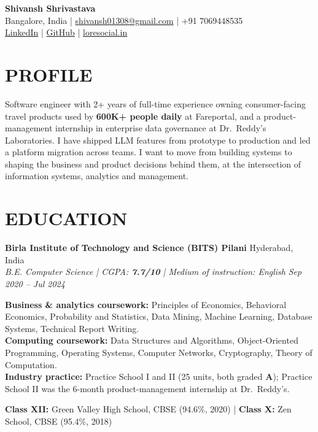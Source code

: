 \documentclass[a4paper,10pt]{extarticle}
\newcommand{\resumeSubheading}[4]{%
    \textbf{#1} \hfill #2\\
    \textit{#3} \hfill \textit{#4}}
\begin{document}
\begin{center}
    {\Large \textbf{Shivansh Shrivastava}}\\[4pt]
    Bangalore, India \quad | \quad
    \href{mailto:shivansh01308@gmail.com}{shivansh01308@gmail.com}
    \quad | \quad +91 7069448535\\[2pt]
    \href{https://www.linkedin.com/in/shivansh-shrivastava-716013205}{LinkedIn}
    \quad | \quad
    \href{https://github.com/shivansh-13}{GitHub}
    \quad | \quad
    \href{https://loresocial.in}{loresocial.in}
\end{center}

\section*{PROFILE}

Software engineer with 2+ years of full-time experience owning consumer-facing travel products used by
\textbf{600K+ people daily} at Fareportal, and a product-management internship in enterprise data
governance at Dr.\ Reddy's Laboratories. I have shipped LLM features from prototype to production and
led a platform migration across teams. I want to move from building systems to shaping the business and
product decisions behind them, at the intersection of information systems, analytics and management.

\section*{EDUCATION}

\resumeSubheading
{Birla Institute of Technology and Science (BITS) Pilani}
{Hyderabad, India}
{B.E. Computer Science \quad | \quad CGPA: \textbf{7.7/10} \quad | \quad Medium of instruction: English}
{Sep 2020 -- Jul 2024}

\textbf{Business \& analytics coursework:} Principles of Economics, Behavioral Economics, Probability and
Statistics, Data Mining, Machine Learning, Database Systems, Technical Report Writing.\\
\textbf{Computing coursework:} Data Structures and Algorithms, Object-Oriented Programming, Operating
Systems, Computer Networks, Cryptography, Theory of Computation.\\
\textbf{Industry practice:} Practice School I and II (25 units, both graded \textbf{A}); Practice School II
was the 6-month product-management internship at Dr.\ Reddy's.

\vspace{2pt}
\textbf{Class XII:} Green Valley High School, CBSE (94.6\%, 2020) \quad | \quad
\textbf{Class X:} Zen School, CBSE (95.4\%, 2018)
\end{document}
